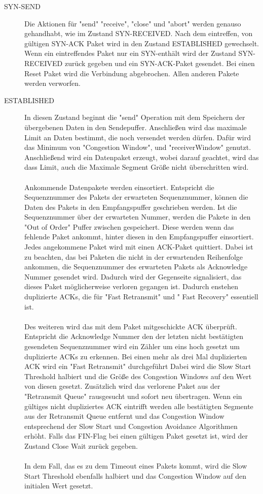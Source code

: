 \begin{description}
	
\item[SYN-SEND]
Die Aktionen für "{}send"{} {}"receive"{}, {}"close"{} und "{}abort"{} werden genauso gehandhabt, wie im Zustand SYN-RECEIVED.
Nach dem eintreffen, von gültigen SYN-ACK Paket wird in den Zustand ESTABLISHED gewechselt. Wenn ein eintreffendes Paket nur ein SYN-enthält wird der Zustand SYN-RECEIVED zurück gegeben und ein SYN-ACK-Paket gesendet. Bei einen Reset Paket wird die Verbindung abgebrochen. Allen anderen Pakete werden verworfen.   
	
\item[ESTABLISHED]

In diesen Zustand beginnt die {}"send"{} Operation mit dem Speichern der übergebenen Daten in den Sendepuffer. Anschließen wird das maximale Limit an Daten bestimmt, die noch versendet werden dürfen. Dafür wird das Minimum von "Congestion Window", und "receiverWindow"{} genutzt. Anschließend wird ein Datenpaket erzeugt, wobei darauf geachtet, wird das dass Limit, auch die Maximale Segment Größe nicht überschritten wird. \\\\
Ankommende Datenpakete werden einsortiert. Entspricht die Sequenznummer des Pakets der erwarteten Sequenznummer, können die Daten des Pakets in den Empfangspuffer geschrieben werden. Ist die Sequenznummer über der erwarteten Nummer, werden die Pakete in den "{}Out of Order"{}  Puffer zwischen gespeichert. Diese werden wenn das fehlende Paket ankommt, hinter diesen in den Empfangspuffer einsortiert. Jedes angekommene Paket wird mit einen ACK-Paket quittiert. Dabei ist zu beachten, das bei Paketen die nicht in der erwartenden Reihenfolge ankommen, die Sequenznummer des erwarteten Pakets als Acknowledge Nummer gesendet wird. Dadurch wird der Gegenseite signalisiert, das dieses Paket möglicherweise verloren gegangen ist. Dadurch enstehen duplizierte ACKs,  die für  "{}Fast Retransmit"{} und "{} Fast Recovery"{} essentiell ist.\\\\
Des weiteren wird das mit dem Paket mitgeschickte ACK überprüft. Entspricht die Acknowledge Nummer den der letzten nicht bestätigten gesendeten Sequenznummer wird ein Zähler um eins hoch gesetzt um duplizierte ACKs zu erkennen. Bei einen mehr als drei Mal duplizierten ACK wird ein {}"Fast Retransmit"{} durchgeführt Dabei wird die Slow Start Threshold halbiert und die Größe des Congestion Windows auf den Wert von diesen gesetzt. Zusätzlich wird das verlorene Paket aus der "{}Retransmit Queue"{} rausgesucht und sofort neu übertragen. Wenn ein gültiges nicht dupliziertes ACK eintrifft werden alle bestätigten Segmente aus der Retransmit Queue entfernt und das Congestion Window entsprechend der Slow Start und Congestion Avoidance Algorithmen erhöht. Falls das FIN-Flag bei einen gültigen Paket gesetzt ist, wird der Zustand Close Wait zurück gegeben.  \\\\
In dem Fall, das es zu dem Timeout eines Pakets kommt, wird die Slow Start Threshold ebenfalls halbiert und das Congestion Window auf den initialen Wert gesetzt. 


\end{description}
